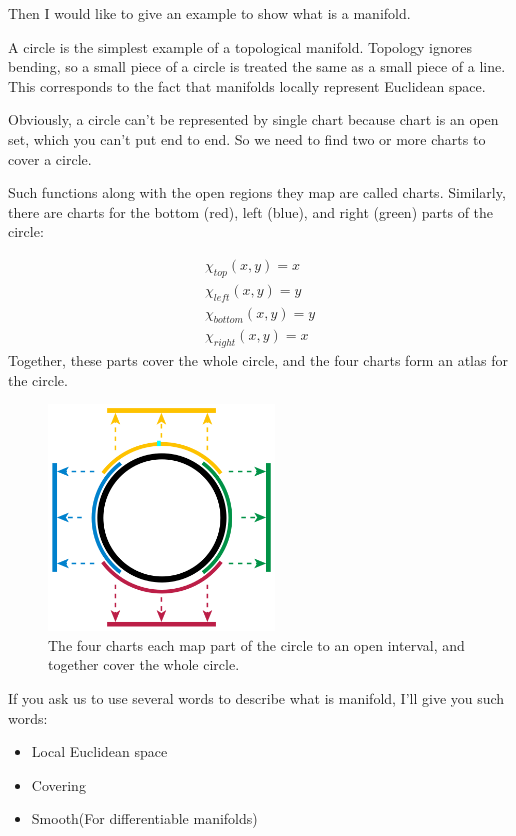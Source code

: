 Then I would like to give an example to show what is a manifold.

\begin{tcolorbox}[title=\textbf{Circle},colback=SeaGreen!10!CornflowerBlue!10,colframe=RoyalPurple!55!Aquamarine!100!]
    A circle is the simplest example of a topological manifold. Topology ignores bending, so a small piece of a circle is treated the same as a small piece of a line. This corresponds to the fact that manifolds locally represent Euclidean space.

    Obviously, a circle can't be represented by single chart because chart is an open set, which you can't put end to end. So we need to find two or more charts to cover a circle. 

    Such functions along with the open regions they map are called charts. Similarly, there are charts for the bottom (red), left (blue), and right (green) parts of the circle:

    \begin{align*}
        \chi_{top}(x,y)=x\\
        \chi_{left}(x,y)=y\\
        \chi_{bottom}(x,y)=y\\
        \chi_{right}(x,y)=x
    \end{align*}
    Together, these parts cover the whole circle, and the four charts form an atlas for the circle.
\end{tcolorbox}

\begin{figure}[htbp]
    \centering
    \includegraphics[width=6cm]{pic/circle.png}
    \caption{The four charts each map part of the circle to an open interval, and together cover the whole circle.}
\end{figure}

If you ask us to use several words to describe what is manifold, I'll give you such words:

\begin{itemize}
    \item Local Euclidean space
    \item Covering
    \item Smooth(For differentiable manifolds)
\end{itemize}


